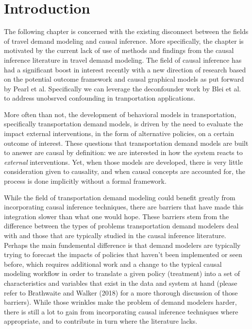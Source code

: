 \section{Introduction}
The following chapter is concerned with the existing disconnect between the 
fields of travel demand modeling and causal inference. More specifically, the 
chapter is motivated by the current lack of use of methods and findings from 
the causal inference literature in travel demand modeling. The field of causal 
inference has had a significant boost in interest recently with a new 
direction of research based on the potential outcome framework and causal 
graphical models as put forward by Pearl et al. Specifically we can leverage 
the deconfounder work by Blei et al. to address unobsrved confounding in 
tranportation applications.

More often than not, the development of behavioral models in transportation, 
specifically transportation demand models, is driven by the need to evaluate 
the impact external interventions, in the form of alternative policies, on a 
certain outcome of interest. These questions that transportation demand models 
are built to answer are causal by definition: we are interested in how the 
system reacts to \textit{external} interventions. Yet, when those models are 
developed, there is very little consideration given to causality, and when 
causal concepts are accounted for, the process is done implicitly without a 
formal framework. 

While the field of transportation demand modeling could benefit greatly from 
incorporating causal inference techniques, there are barriers that have made 
this integration slower than what one would hope. These barriers stem from 
the difference between the types of problems transportation demand modelers deal with and those that are typically studied in the causal inference 
literature. Perhaps the main fundemental difference is that demand modelers 
are typically trying to forecast the impacts of policies that haven't been 
implemented or seen before, which requires additional work and a change to the
typical causal modeling workflow in order to translate a given policy 
(treatment) into a set of characteristics and variables that exist in the
data and system at hand (please refer to Brathwaite and Walker (2018) for a 
more thorough discussion of those barriers). While those wrinkles make the
problem of demand modelers harder, there is still a lot to gain from 
incorporating causal inference techniques where appropriate, and to contribute
in turn where the literature lacks.  


